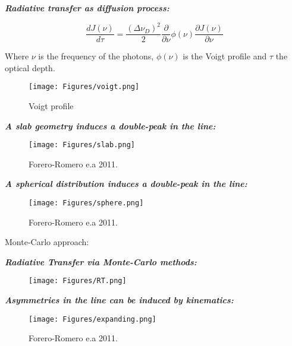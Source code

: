 \documentclass{beamer}
\begin{document}
\begin{frame}{\textit{\textbf{Radiative transfer as diffusion process:}}}

\begin{equation}\label{eq:analytic}
\dfrac{d J(\nu)}{d\tau} = \dfrac{(\Delta \nu_D)^2}{2}\dfrac{\partial}{\partial \nu}\phi (\nu) \dfrac{\partial J(\nu)}{\partial \nu}
\end{equation}

Where $\nu$ is the frequency of the photons, $\phi(\nu)$ is the Voigt profile and $\tau$
the optical depth.

\begin{figure}
\texttt{[image: Figures/voigt.png]}
\caption{Voigt profile}
\end{figure}

\end{frame}



\begin{frame}{\textit{\textbf{A slab geometry induces a double-peak in the line:}}}
\begin{figure}
\texttt{[image: Figures/slab.png]}
\caption*{Forero-Romero e.a 2011.}
\end{figure}
\end{frame}


\begin{frame}{\textit{\textbf{A spherical distribution induces a double-peak in the line:}}}
\begin{figure}
\texttt{[image: Figures/sphere.png]}
\caption*{Forero-Romero e.a 2011.}
\end{figure}
\end{frame}

\begin{frame}
\LARGE{Monte-Carlo approach:}
\end{frame}

\begin{frame}{\textit{\textbf{Radiative Transfer via Monte-Carlo methods:}}}
\begin{figure}
\texttt{[image: Figures/RT.png]}
\end{figure}
\end{frame}



\begin{frame}{\textit{\textbf{Asymmetries in the line can be induced by kinematics:}}}
\begin{figure}
\texttt{[image: Figures/expanding.png]}
\caption*{Forero-Romero e.a 2011.}
\end{figure}
\end{frame}
\end{document}
